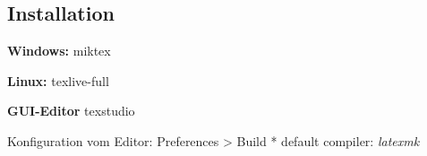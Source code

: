 \subsection{Installation}
\textbf{Windows:} miktex

\textbf{Linux:} texlive-full

\textbf{GUI-Editor} texstudio

Konfiguration vom Editor: Preferences > Build
* default compiler: \emph{latexmk}
